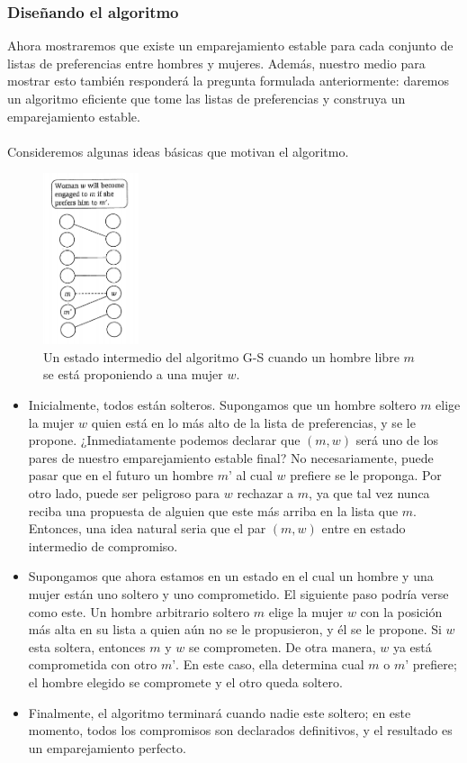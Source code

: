 \documentclass[a4paper]{article}
\begin{document}
\subsubsection*{Diseñando el algoritmo} 
Ahora mostraremos que existe un emparejamiento estable para cada conjunto de listas de preferencias entre hombres y mujeres. Además, nuestro medio para mostrar esto también responderá  la pregunta formulada anteriormente: daremos un algoritmo eficiente que tome las listas de preferencias y construya un emparejamiento estable.  
\\
    \\
Consideremos algunas ideas básicas que motivan el algoritmo. 
\\
\begin{figure}
\includegraphics[width=0.25\textwidth]{Imagenes-Seccion2/figura1_2.PNG}
\caption{ Un estado intermedio  del algoritmo G-S cuando un hombre libre $m$ se está proponiendo a una mujer $w$.}
 \label{fig:Imagenes-Seccion2/figura1_2.PNG}
\end{figure}
   \begin{itemize}
      	\item Inicialmente, todos están solteros. Supongamos que un hombre soltero $m$ elige la mujer $w$ quien está en lo más alto de la lista de preferencias, y se le propone. ¿Inmediatamente podemos declarar que $(m,w)$ será uno de los pares de nuestro emparejamiento estable final? No necesariamente, puede pasar que en el futuro un hombre $m’$ al cual $w$ prefiere se le proponga. Por otro lado, puede ser peligroso para $w$ rechazar a $m$, ya que tal vez nunca reciba una propuesta de alguien que este más arriba en la lista que $m$. Entonces, una idea natural seria que el par $(m,w)$ entre en estado intermedio de compromiso.
\item Supongamos que ahora estamos en un estado en el cual un hombre y una mujer están uno soltero y uno comprometido. El siguiente paso podría verse como este. Un hombre arbitrario soltero $m$ elige la mujer $w$ con la posición más alta en su lista a quien aún no se le propusieron, y él se le propone. Si $w$ esta soltera, entonces $m$ y $w$ se comprometen. De otra manera, $w$ ya está comprometida con otro $m’$. En este caso, ella determina cual $m$ o $m’$ prefiere; el hombre elegido se compromete y el otro queda soltero. 
  \item Finalmente, el algoritmo terminará cuando nadie este soltero; en este momento, todos los compromisos son declarados definitivos, y el resultado es un emparejamiento perfecto. 
    \end{itemize}
    
\end{document}
